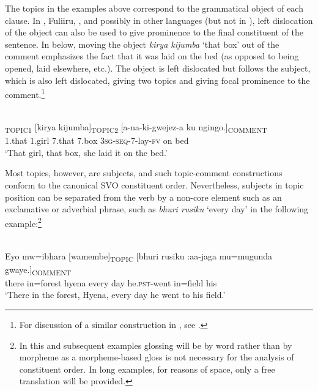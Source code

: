 \documentclass[output=paper]{langsci/langscibook}
\begin{document}
The topics in the examples above correspond to the grammatical object of each clause. In , Fuliiru, , and possibly in other languages (but not in ), left dislocation of the object can also be used to give prominence to the final constituent of the sentence. In  below, moving the object \textit{kirya kijumba} ‘that box’ out of the comment emphasizes the fact that it was laid on the bed (as opposed to being opened, laid elsewhere, etc.). The object is left dislocated but follows the subject, which is also left dislocated, giving two topics and giving focal prominence to the comment.\footnote{For discussion of a similar construction in , see \citet[756--758]{yoneda2011}.}

\ea\label{ex:4.nicolle}
\\
\textsubscript{TOPIC1} [kirya kijumba]\textsubscript{TOPIC2} [a-na-ki-gwejez-a ku ngingo.]\textsubscript{COMMENT}\\
{\db}1.that 1.girl {\db}7.that 7.box {\db}\textsc{3sg-seq}-7-lay-\textsc{fv} on bed\\
\glt ‘That girl, that box, she laid it on the bed.’
\z

Most topics, however, are subjects, and such topic-comment constructions conform to the canonical SVO constituent order. Nevertheless, subjects in topic position can be separated from the verb by a non-core element such as an exclamative or adverbial phrase, such as \textit{bhuri rusiku} ‘every day’ in the following example:\footnote{In this and subsequent examples glossing will be by word rather than by morpheme as a morpheme-based gloss is not necessary for the analysis of constituent order. In long examples, for reasons of space, only a free translation will be provided.}


\ea\label{ex:5.nicolle}
\\
\gll Eyo mw=ibhara [wamembe]\textsubscript{TOPIC} [bhuri rusiku :aa-jaga{\rmfnm} mu=mugunda gwaye.]\textsubscript{COMMENT}\\
there in=forest {\db}hyena {\db}every  day he.\textsc{pst}-went in=field his \\ 
\glt ‘There in the forest, Hyena, every day he went to his field.’
\z

\end{document}
